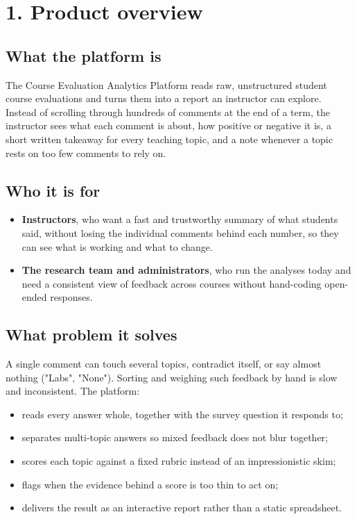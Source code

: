\documentclass[
  11pt,
]{article}
\providecommand{\tightlist}{%
  \setlength{\itemsep}{0pt}\setlength{\parskip}{0pt}}
\begin{document}
\section{1. Product overview}\label{1-product-overview}

\subsection{What the platform is}\label{what-the-platform-is}

The Course Evaluation Analytics Platform reads raw, unstructured student course
evaluations and turns them into a report an instructor can explore. Instead of
scrolling through hundreds of comments at the end of a term, the instructor sees
what each comment is about, how positive or negative it is, a short written
takeaway for every teaching topic, and a note whenever a topic rests on too few
comments to rely on.

\subsection{Who it is for}\label{who-it-is-for}

\begin{itemize}
\tightlist
\item
  \textbf{Instructors}, who want a fast and trustworthy summary of what students
  said, without losing the individual comments behind each number, so they can
  see what is working and what to change.
\item
  \textbf{The research team and administrators}, who run the analyses today and
  need a consistent view of feedback across courses without hand-coding
  open-ended responses.
\end{itemize}

\subsection{What problem it solves}\label{what-problem-it-solves}

A single comment can touch several topics, contradict itself, or say almost
nothing ("Labs", "None"). Sorting and weighing such feedback by hand is slow and
inconsistent. The platform:

\begin{itemize}
\tightlist
\item
  reads every answer whole, together with the survey question it responds to;
\item
  separates multi-topic answers so mixed feedback does not blur together;
\item
  scores each topic against a fixed rubric instead of an impressionistic skim;
\item
  flags when the evidence behind a score is too thin to act on;
\item
  delivers the result as an interactive report rather than a static spreadsheet.
\end{itemize}
\end{document}
